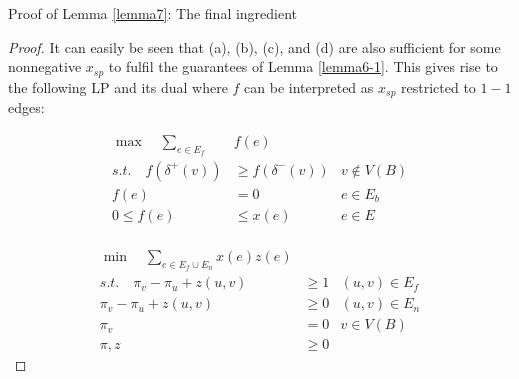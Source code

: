 \documentclass[./main.tex]{subfiles}
\begin{document}
\begin{subsection}{Proof of Lemma \ref{lemma7}: The final ingredient}
\begin{proof}
		It can easily be seen that (a), (b), (c), and (d) are also sufficient for some nonnegative $x_{sp}$ to fulfil the guarantees of Lemma \ref{lemma6-1}.
		 This gives rise to the following LP and its dual where $f$ can be interpreted as $x_{sp}$ restricted to $1-1$ edges:\vspace{2mm}\\
		\begin{minipage}{0.39\textwidth}
		\begin{align*}
			\max\quad\sum_{e\in E_f}&f(e)\\
			s.t.\quad f(\delta^+(v))&\geq f(\delta^-(v))   &v\notin V(B)              \\
			f(e)&=0  &e\in E_b\\
			0\leq f(e)&\leq x(e) &e\in E\\
		\end{align*}
		\end{minipage}
	\hfill\vline\hfill
	\begin{minipage}{0.50\textwidth}
	\begin{align*}
		\min\quad\sum_{e\in E_f\cup E_n}x(e)z(e)\\
		s.t.\quad \pi_v - \pi_u + z(u,v)&\geq 1 &(u,v)\in E_f\\
		\pi_v - \pi_u + z(u,v)&\geq 0 &(u,v)\in E_n\\
		\pi_v &= 0 &v\in V(B)\\
		\pi, z&\geq 0
	\end{align*}
	\end{minipage}


\end{proof}
\end{subsection}
\end{document}
